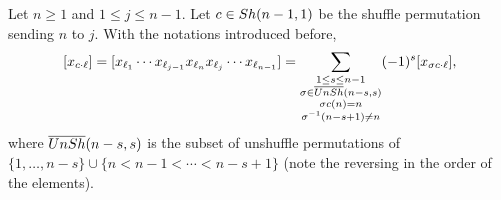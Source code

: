 \documentclass[10pt,a4paper]{amsart}
\begin{document}
\begin{proposition}
\label{prop:trucnul}
Let $n\geq 1$ and $1\leq j\leq n-1$. Let $c\in {\rm Sh}(n-1,1)$ be the shuffle permutation sending $n$ to $j$. With the notations introduced before,
$$
[x_{c\cdot \ell}] = [x_{\ell_1}\cdots x_{\ell_{j-1}} x_{\ell_n} x_{\ell_j} \cdots x_{\ell_{n-1}}] = \sum_{\substack{1\leq s \leq n-1\\\sigma \in \overline{\rm UnSh}{(n-s,s)} \\ \sigma c(n)=n \\ \sigma^{-1}(n-s+1)\neq n}} (-1)^{s}[x_{\sigma c \cdot \ell}],
$$
where $\overline{\rm UnSh}{(n-s,s)}$ is the subset of unshuffle permutations of $\{1,\ldots,n-s\}\cup \{n < n-1 < \cdots < n-s+1\}$ (note the reversing in the order of the elements). 
\end{proposition}
\end{document}

